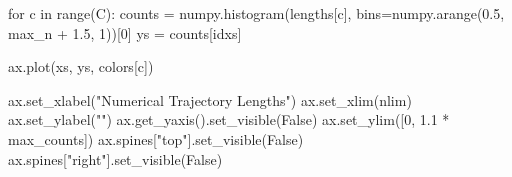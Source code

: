 \documentclass[
  letterpaper,
  DIV=11,
  numbers=noendperiod]{scrartcl}
\newenvironment{Shaded}{\begin{snugshade}}{\end{snugshade}}
\newcommand{\BuiltInTok}[1]{\textcolor[rgb]{0.00,0.23,0.31}{#1}}
\newcommand{\ControlFlowTok}[1]{\textcolor[rgb]{0.00,0.23,0.31}{#1}}
\newcommand{\DecValTok}[1]{\textcolor[rgb]{0.68,0.00,0.00}{#1}}
\newcommand{\FloatTok}[1]{\textcolor[rgb]{0.68,0.00,0.00}{#1}}
\newcommand{\KeywordTok}[1]{\textcolor[rgb]{0.00,0.23,0.31}{#1}}
\newcommand{\NormalTok}[1]{\textcolor[rgb]{0.00,0.23,0.31}{#1}}
\newcommand{\OperatorTok}[1]{\textcolor[rgb]{0.37,0.37,0.37}{#1}}
\newcommand{\StringTok}[1]{\textcolor[rgb]{0.13,0.47,0.30}{#1}}
\newcommand{\VariableTok}[1]{\textcolor[rgb]{0.07,0.07,0.07}{#1}}
\begin{document}
\begin{Shaded}
\begin{Highlighting}[]
  \ControlFlowTok{for}\NormalTok{ c }\KeywordTok{in} \BuiltInTok{range}\NormalTok{(C):}
\NormalTok{    counts }\OperatorTok{=}\NormalTok{ numpy.histogram(lengths[c],}
\NormalTok{                             bins}\OperatorTok{=}\NormalTok{numpy.arange(}\FloatTok{0.5}\NormalTok{, max\_n }\OperatorTok{+} \FloatTok{1.5}\NormalTok{, }\DecValTok{1}\NormalTok{))[}\DecValTok{0}\NormalTok{]}
\NormalTok{    ys }\OperatorTok{=}\NormalTok{ counts[idxs]}

\NormalTok{    ax.plot(xs, ys, colors[c])}

\NormalTok{  ax.set\_xlabel(}\StringTok{"Numerical Trajectory Lengths"}\NormalTok{)}
\NormalTok{  ax.set\_xlim(nlim)}
\NormalTok{  ax.set\_ylabel(}\StringTok{""}\NormalTok{)}
\NormalTok{  ax.get\_yaxis().set\_visible(}\VariableTok{False}\NormalTok{)}
\NormalTok{  ax.set\_ylim([}\DecValTok{0}\NormalTok{, }\FloatTok{1.1} \OperatorTok{*}\NormalTok{ max\_counts])}
\NormalTok{  ax.spines[}\StringTok{"top"}\NormalTok{].set\_visible(}\VariableTok{False}\NormalTok{)}
\NormalTok{  ax.spines[}\StringTok{"right"}\NormalTok{].set\_visible(}\VariableTok{False}\NormalTok{)}
\end{Highlighting}
\end{Shaded}
\end{document}
